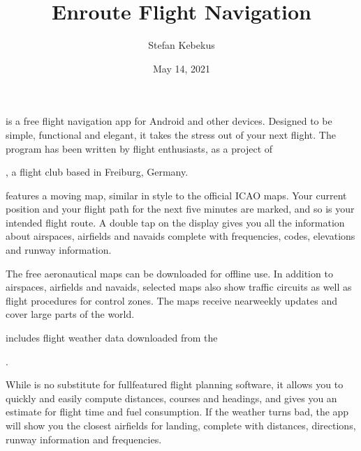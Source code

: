 \documentclass[letterpaper,10pt,english]{sphinxmanual}
\title{Enroute Flight Navigation}
\date{May 14, 2021}
\author{Stefan Kebekus}
\let\sphinxpxdimen\pdfpxdimen\else\newdimen\sphinxpxdimen
\begin{document}
\pagestyle{empty}
\sphinxmaketitle
\pagestyle{plain}
\sphinxtableofcontents
\pagestyle{normal}
\label{\detokenize{index::doc}}


\noindent{\hspace*{\fill}\sphinxincludegraphics[width=100\sphinxpxdimen]{{de.akaflieg_freiburg.enroute}.png}\hspace*{\fill}}

\sphinxAtStartPar
{} is a free flight navigation app for Android and
other devices.  Designed to be simple, functional and elegant, it takes the
stress out of your next flight. The program has been written by flight
enthusiasts, as a project of %
\begin{footnote}[1]\sphinxAtStartFootnote
{}
%
\end{footnote}, a flight club based in Freiburg, Germany.

\sphinxAtStartPar
{} features a moving map, similar in style to the
official ICAO maps. Your current position and your flight path for the next five
minutes are marked, and so is your intended flight route. A double tap on the
display gives you all the information about airspaces, airfields and navaids \textendash{}
complete with frequencies, codes, elevations and runway information.

\sphinxAtStartPar
The free aeronautical maps can be downloaded for offline use. In addition to
airspaces, airfields and navaids, selected maps also show traffic circuits as
well as flight procedures for control zones. The maps receive near\sphinxhyphen{}weekly
updates and cover large parts of the world.

\sphinxAtStartPar
{} includes flight weather data downloaded from the
%
\begin{footnote}[2]\sphinxAtStartFootnote
{}
%
\end{footnote}.

\sphinxAtStartPar
While  is no substitute for full\sphinxhyphen{}featured flight
planning software, it allows you to quickly and easily compute distances,
courses and headings, and gives you an estimate for flight time and fuel
consumption. If the weather turns bad, the app will show you the closest
airfields for landing, complete with distances, directions, runway information
and frequencies.
\end{document}
